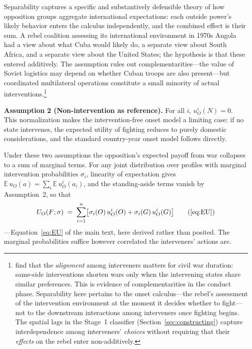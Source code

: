 Separability captures a specific and substantively defensible theory of how
opposition groups aggregate international expectations: each outside power's
likely behavior enters the calculus independently, and the combined effect
is their sum.  A rebel coalition assessing its international environment in
1970s Angola had a view about what Cuba would likely do, a separate view
about South Africa, and a separate view about the United States; the
hypothesis is that these entered additively.  The assumption rules out
complementarities---the value of Soviet logistics may depend on whether
Cuban troops are also present---but coordinated multilateral operations
constitute a small minority of actual interventions.\footnote{%
  \citet{aydinregan2011} find that the \textit{alignment} among interveners matters for
  civil war duration: same-side interventions shorten wars only when the
  intervening states share similar preferences.  This is evidence of
  complementarities in the conduct phase.  Separability here pertains to
  the onset calculus---the rebel's assessment of the intervention
  environment at the moment it decides whether to fight---not to the
  downstream interactions among interveners once fighting begins.  The
  spatial lags in the Stage~1 classifier (Section~\ref{sec:constructing}) capture
  interdependence among interveners' \textit{choices} without requiring that
  their \textit{effects} on the rebel enter non-additively.}

\textbf{Assumption 2 (Non-intervention as reference).}  For all $i$,
$u_O^i(N) = 0$.  This normalization makes the intervention-free onset model a
limiting case: if no state intervenes, the expected utility of fighting
reduces to purely domestic considerations, and the standard country-year
onset model follows directly.

Under these two assumptions the opposition's expected payoff from war
collapses to a sum of marginal terms.  For any joint distribution over
profiles with marginal intervention probabilities $\sigma_i$, linearity of
expectation gives $\mathbb{E}\,u_O(a) = \sum_i \mathbb{E}\,u_O^i(a_i)$, and
the standing-aside terms vanish by Assumption~2, so that
\begin{equation*}
  U_O(F; \sigma) \;=\; \sum_{i=1}^{n} \bigl[\sigma_i(O)\, u_O^i(O) +
  \sigma_i(G)\, u_O^i(G)\bigr] \tag{\ref{eq:EU}}
\end{equation*}
---Equation~\eqref{eq:EU} of the main text, here derived rather than posited.
The marginal probabilities suffice however correlated the interveners'
actions are.

